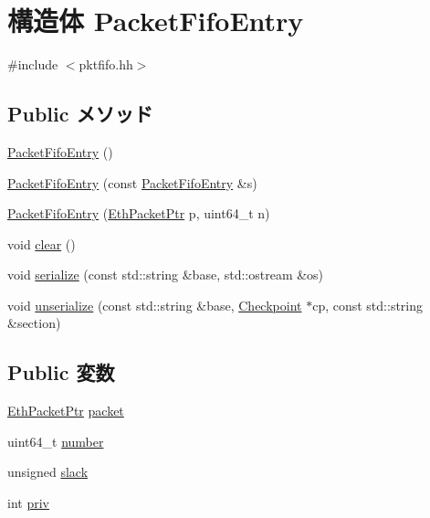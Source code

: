 \hypertarget{structPacketFifoEntry}{
\section{構造体 PacketFifoEntry}
\label{structPacketFifoEntry}
}


{\ttfamily \#include $<$pktfifo.hh$>$}\subsection*{Public メソッド}
\begin{DoxyCompactItemize}
\item 
\hyperlink{structPacketFifoEntry_a92f16d63f54e558d12120891731012fd}{PacketFifoEntry} ()
\item 
\hyperlink{structPacketFifoEntry_aad99b038036dbba71b56bd78cdf6f150}{PacketFifoEntry} (const \hyperlink{structPacketFifoEntry}{PacketFifoEntry} \&s)
\item 
\hyperlink{structPacketFifoEntry_aa20d1fd6eba8c0cc64ec1bbe2d28a8e7}{PacketFifoEntry} (\hyperlink{classRefCountingPtr}{EthPacketPtr} p, uint64\_\-t n)
\item 
void \hyperlink{structPacketFifoEntry_ac8bb3912a3ce86b15842e79d0b421204}{clear} ()
\item 
void \hyperlink{structPacketFifoEntry_ab4138b21b48e3371a8e20df72b675a88}{serialize} (const std::string \&base, std::ostream \&os)
\item 
void \hyperlink{structPacketFifoEntry_a147c320e3d6506edf5587a40cd8e430d}{unserialize} (const std::string \&base, \hyperlink{classCheckpoint}{Checkpoint} $\ast$cp, const std::string \&section)
\end{DoxyCompactItemize}
\subsection*{Public 変数}
\begin{DoxyCompactItemize}
\item 
\hyperlink{classRefCountingPtr}{EthPacketPtr} \hyperlink{structPacketFifoEntry_a8bd0d3f7eb9e8d7189c7027028a5fac0}{packet}
\item 
uint64\_\-t \hyperlink{structPacketFifoEntry_ae96d8ae9cc03cb8691b3582c71dcf371}{number}
\item 
unsigned \hyperlink{structPacketFifoEntry_afac9472c53898cb57e4cbfbf21a822cd}{slack}
\item 
int \hyperlink{structPacketFifoEntry_abf581830e96928ca11dbfce50d99aa45}{priv}
\end{DoxyCompactItemize}


